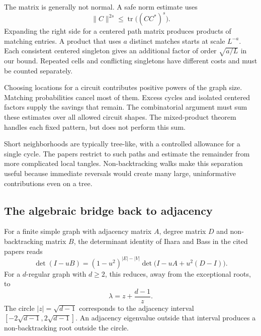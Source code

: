 \documentclass[11pt]{article}
\theoremstyle{definition}
\theoremstyle{remark}
\newcommand{\1}{\mathbf 1}
\DeclareMathOperator{\tr}{tr}
\begin{document}
The matrix is generally not normal. A safe norm estimate uses
\[
\|C\|^{2s}\le\tr\bigl((CC^*)^s\bigr).
\]
Expanding the right side for a centered path matrix produces products of matching entries. A product that uses $a$ distinct matches starts at scale $L^{-a}$. Each consistent centered singleton gives an additional factor of order $\sqrt{a/L}$ in our bound. Repeated cells and conflicting singletons have different costs and must be counted separately.

Choosing locations for a circuit contributes positive powers of the graph size. Matching probabilities cancel most of them. Excess cycles and isolated centered factors supply the savings that remain. The combinatorial argument must sum these estimates over all allowed circuit shapes. The mixed-product theorem handles each fixed pattern, but does not perform this sum.

Short neighborhoods are typically tree-like, with a controlled allowance for a single cycle. The papers restrict to such paths and estimate the remainder from more complicated local tangles. Non-backtracking walks make this separation useful because immediate reversals would create many large, uninformative contributions even on a tree.

\subsection{The algebraic bridge back to adjacency}

For a finite simple graph with adjacency matrix $A$, degree matrix $D$ and non-backtracking matrix $B$, the determinant identity of Ihara and Bass in the cited papers reads
\begin{equation}\label{eq:ihara}
\det(I-uB)=(1-u^2)^{|E|-|V|}\det\bigl(I-uA+u^2(D-I)\bigr).
\end{equation}
For a $d$-regular graph with $d\ge2$, this reduces, away from the exceptional roots, to
\[
\lambda=z+\frac{d-1}{z}.
\]
The circle $|z|=\sqrt{d-1}$ corresponds to the adjacency interval $[-2\sqrt{d-1},2\sqrt{d-1}]$. An adjacency eigenvalue outside that interval produces a non-backtracking root outside the circle.
\end{document}
